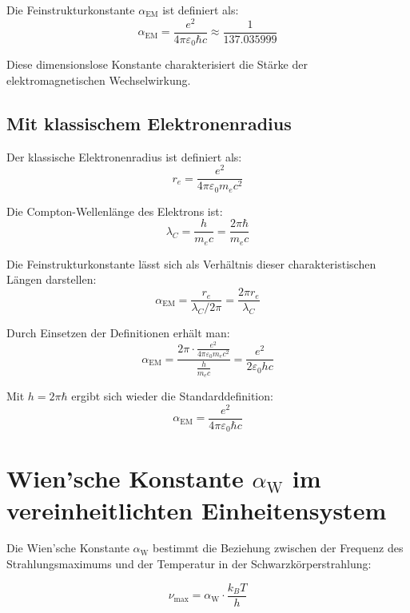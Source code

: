 \documentclass[12pt,a4paper]{article}
\newcommand{\alphaEM}{\alpha_{\text{EM}}}
\newcommand{\alphaW}{\alpha_{\text{W}}}
\begin{document}
	Die Feinstrukturkonstante \(\alphaEM\) ist definiert als:
	\begin{equation}
		\alphaEM = \frac{e^2}{4\pi \varepsilon_0 \hbar c} \approx \frac{1}{137.035999}
	\end{equation}
	
	Diese dimensionslose Konstante charakterisiert die Stärke der elektromagnetischen Wechselwirkung.
	
	\subsection{Mit klassischem Elektronenradius}
	
	Der klassische Elektronenradius ist definiert als:
	\begin{equation}
		r_e = \frac{e^2}{4\pi \varepsilon_0 m_e c^2}
	\end{equation}
	
	Die Compton-Wellenlänge des Elektrons ist:
	\begin{equation}
		\lambda_C = \frac{h}{m_e c} = \frac{2\pi\hbar}{m_e c}
	\end{equation}
	
	Die Feinstrukturkonstante lässt sich als Verhältnis dieser charakteristischen Längen darstellen:
	\begin{equation}
		\alphaEM = \frac{r_e}{\lambda_C/2\pi} = \frac{2\pi r_e}{\lambda_C}
	\end{equation}
	
	Durch Einsetzen der Definitionen erhält man:
	\begin{equation}
		\alphaEM = \frac{2\pi \cdot \frac{e^2}{4\pi \varepsilon_0 m_e c^2}}{\frac{h}{m_e c}} = \frac{e^2}{2\varepsilon_0 h c}
	\end{equation}
	
	Mit \(h = 2\pi\hbar\) ergibt sich wieder die Standarddefinition:
	\begin{equation}
		\alphaEM = \frac{e^2}{4\pi \varepsilon_0 \hbar c}
	\end{equation}
	
	\section{Wien'sche Konstante \(\alphaW\) im vereinheitlichten Einheitensystem}
	
	Die Wien'sche Konstante \(\alphaW\) bestimmt die Beziehung zwischen der Frequenz des Strahlungsmaximums und der Temperatur in der Schwarzkörperstrahlung:
	
	\begin{equation}
		\nu_{\text{max}} = \alphaW \cdot \frac{k_B T}{h}
	\end{equation}
	
\end{document}
